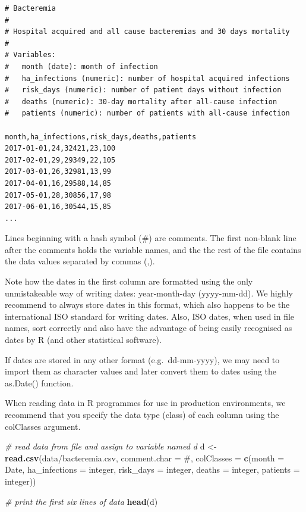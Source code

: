 \documentclass[
]{book}
\newenvironment{Shaded}{\begin{snugshade}}{\end{snugshade}}
\newcommand{\AttributeTok}[1]{\textcolor[rgb]{0.13,0.29,0.53}{#1}}
\newcommand{\CommentTok}[1]{\textcolor[rgb]{0.56,0.35,0.01}{\textit{#1}}}
\newcommand{\FunctionTok}[1]{\textcolor[rgb]{0.13,0.29,0.53}{\textbf{#1}}}
\newcommand{\NormalTok}[1]{#1}
\newcommand{\OtherTok}[1]{\textcolor[rgb]{0.56,0.35,0.01}{#1}}
\newcommand{\StringTok}[1]{\textcolor[rgb]{0.31,0.60,0.02}{#1}}
\begin{document}
\begin{verbatim}
# Bacteremia
# 
# Hospital acquired and all cause bacteremias and 30 days mortality
# 
# Variables:
#   month (date): month of infection
#   ha_infections (numeric): number of hospital acquired infections
#   risk_days (numeric): number of patient days without infection
#   deaths (numeric): 30-day mortality after all-cause infection
#   patients (numeric): number of patients with all-cause infection

month,ha_infections,risk_days,deaths,patients
2017-01-01,24,32421,23,100
2017-02-01,29,29349,22,105
2017-03-01,26,32981,13,99
2017-04-01,16,29588,14,85
2017-05-01,28,30856,17,98
2017-06-01,16,30544,15,85
...
\end{verbatim}

Lines beginning with a hash symbol (\#) are comments. The first non-blank line after the comments holds the variable names, and the the rest of the file contains the data values separated by commas (,).

Note how the dates in the first column are formatted using the only unmistakeable way of writing dates: year-month-day (yyyy-mm-dd). We highly recommend to always store dates in this format, which also happens to be the international ISO standard for writing dates. Also, ISO dates, when used in file names, sort correctly and also have the advantage of being easily recognised as dates by R (and other statistical software).

If dates are stored in any other format (e.g.~dd-mm-yyyy), we may need to import them as character values and later convert them to dates using the as.Date() function.

When reading data in R programmes for use in production environments, we recommend that you specify the data type (class) of each column using the colClasses argument.

\begin{Shaded}
\begin{Highlighting}[]
\CommentTok{\# read data from file and assign to variable named d}
\NormalTok{d }\OtherTok{\textless{}{-}} \FunctionTok{read.csv}\NormalTok{(}\StringTok{\textquotesingle{}data/bacteremia.csv\textquotesingle{}}\NormalTok{,}
              \AttributeTok{comment.char =} \StringTok{\textquotesingle{}\#\textquotesingle{}}\NormalTok{,}
              \AttributeTok{colClasses   =} \FunctionTok{c}\NormalTok{(}\AttributeTok{month         =} \StringTok{\textquotesingle{}Date\textquotesingle{}}\NormalTok{,}
                               \AttributeTok{ha\_infections =} \StringTok{\textquotesingle{}integer\textquotesingle{}}\NormalTok{,}
                               \AttributeTok{risk\_days     =} \StringTok{\textquotesingle{}integer\textquotesingle{}}\NormalTok{,}
                               \AttributeTok{deaths        =} \StringTok{\textquotesingle{}integer\textquotesingle{}}\NormalTok{,}
                               \AttributeTok{patients      =} \StringTok{\textquotesingle{}integer\textquotesingle{}}\NormalTok{))}

\CommentTok{\# print the first six lines of data}
\FunctionTok{head}\NormalTok{(d)}
\end{Highlighting}
\end{Shaded}
\end{document}
